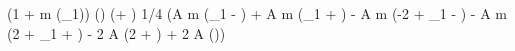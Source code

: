  (1 + m \sin(\omega_1)) \sin(\omega) \sin(\omega + \phi)
1/4 (A m \sin(\omega_1 - \phi) + A m \sin(\omega_1 + \phi) - A m \sin(-2 \omega + \omega_1 - \phi) - A m \sin(2 \omega + \omega_1 + \phi) - 2 A \cos(2 \omega + \phi) + 2 A \cos(\phi))
